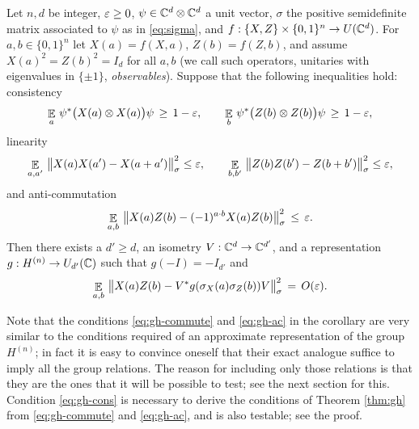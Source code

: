 \begin{corollary}\label{cor:gh}
Let $n,d$ be integer, $\varepsilon \geq 0$, $\psi \in \mathbb{C}^d \otimes \mathbb{C}^d$ a unit vector, $\sigma$ the positive semidefinite matrix associated to $\psi$ as in \eqref{eq:sigma},  and $f: \{X,Z\}\times \{0,1\}^n \to U(\mathbb{C}^d)$. For $a,b\in\{0,1\}^n$ let $X(a)=f(X,a)$, $Z(b)=f(Z,b)$, and assume $X(a)^2=Z(b)^2=I_d$ for all $a,b$ (we call such operators, unitaries with eigenvalues in $\{\pm 1\}$, \emph{observables}). Suppose that the following inequalities hold: consistency
\begin{equation}\label{eq:gh-cons}
 \mathop{\mathbb{E}}\displaylimits_a \, \psi^* \big(X(a) \otimes X(a)\big) \psi \,\geq\,1-\varepsilon,\qquad \mathop{\mathbb{E}}\displaylimits_b \, \psi^* \big(Z(b) \otimes Z(b) \big)\psi\,\geq\,1-\varepsilon,
\end{equation}
linearity
\begin{equation}\label{eq:gh-commute}
 \mathop{\mathbb{E}}\displaylimits_{a,a'} \,\big\|X(a)X(a')-X(a+a')\big\|_\sigma^2 \leq \varepsilon,\qquad\mathop{\mathbb{E}}\displaylimits_{b,b'}\, \big\|Z(b)Z(b')-Z(b+b')\big\|_\sigma^2 \leq \varepsilon,
\end{equation}
and anti-commutation
\begin{equation}\label{eq:gh-ac}
 \mathop{\mathbb{E}}\displaylimits_{a,b} \,\big\| X(a)Z(b)-(-1)^{a\cdot b} X(a)Z(b)\big\|_\sigma^2\,\leq\,\varepsilon.
\end{equation}
Then there exists a $d'\geq d$, an isometry $V:\mathbb{C}^d\to \mathbb{C}^{d'}$, and a representation $g:H^{(n)}\to U_{d'}(\mathbb{C})$ such that $g(-I)=-I_{d'}$ and
$$\mathop{\mathbb{E}}\displaylimits_{a,b}\, \big\| X(a)Z(b) - V^*g(\sigma_X(a)\sigma_Z(b))V \big\|_\sigma^2 \,=\, O(\varepsilon).$$
\end{corollary}

Note that the conditions \eqref{eq:gh-commute} and \eqref{eq:gh-ac} in the corollary are very similar to the conditions required of an approximate representation of the group $H^{(n)}$; in fact it is easy to convince oneself that their exact analogue suffice to imply all the group relations. The reason for including only those relations is that they are the ones that it will be possible to test; see the next section for this. Condition \eqref{eq:gh-cons} is necessary to derive the conditions of Theorem \ref{thm:gh} from \eqref{eq:gh-commute} and \eqref{eq:gh-ac}, and is also testable; see the proof. 


